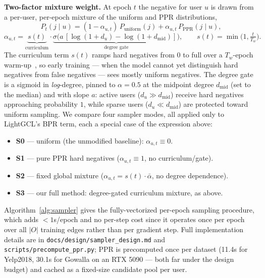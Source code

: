 \documentclass{article}
\begin{document}
\textbf{Two-factor mixture weight.} At epoch $t$ the negative for user $u$ is drawn
from a per-user, per-epoch mixture of the uniform and PPR distributions,
\[
P_t(j\mid u)=(1-\alpha_{u,t})\,P_{\mathrm{uniform}}(j)
+\alpha_{u,t}\,P_{\mathrm{PPR}}(j\mid u),
\]
\[
\alpha_{u,t}=\underbrace{s(t)}_{\text{curriculum}}\cdot
\underbrace{\sigma\!\big(a\,[\log(1+d_u)-\log(1+d_{\mathrm{mid}})]\big)}_{\text{degree gate}},
\qquad s(t)=\min\!\Big(1,\tfrac{t}{T_w}\Big).
\]
The curriculum term $s(t)$ ramps hard negatives from $0$ to full over a $T_w$-epoch
warm-up~\cite{curriculum}, so early training --- when the model cannot yet
distinguish hard negatives from false negatives --- sees mostly uniform negatives.
The degree gate is a sigmoid in \emph{log}-degree, pinned to $\alpha=0.5$ at the
midpoint degree $d_{\mathrm{mid}}$ (set to the median) and with slope $a$: active
users ($d_u\gg d_{\mathrm{mid}}$) receive hard negatives approaching probability
$1$, while sparse users ($d_u\ll d_{\mathrm{mid}}$) are protected toward uniform
sampling. We compare four sampler modes, all applied only to LightGCL's BPR term,
each a special case of the expression above:
\begin{itemize}
\item \textbf{S0} --- uniform (the unmodified baseline): $\alpha_{u,t}\equiv 0$.
\item \textbf{S1} --- pure PPR hard negatives ($\alpha_{u,t}\equiv 1$, no curriculum/gate).
\item \textbf{S2} --- fixed global mixture ($\alpha_{u,t} = s(t)\cdot\bar\alpha$, no degree
dependence).
\item \textbf{S3} --- our full method: degree-gated curriculum mixture, as above.
\end{itemize}
Algorithm~\ref{alg:sampler} gives the fully-vectorized per-epoch sampling procedure,
which adds $<\!1$s/epoch and no per-step cost since it operates once per epoch over
all $|O|$ training edges rather than per gradient step. Full implementation details
are in \texttt{docs/design/sampler\_design.md} and \texttt{scripts/precompute\_ppr.py};
PPR is precomputed once per dataset (11.4s for Yelp2018, 30.1s for Gowalla on an RTX
5090 --- both far under the design budget) and cached as a fixed-size candidate pool
per user.
\end{document}
